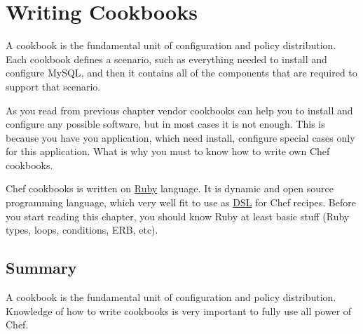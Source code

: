 \chapter{Writing Cookbooks}

A cookbook is the fundamental unit of configuration and policy distribution. Each cookbook defines a scenario, such as everything needed to install and configure MySQL, and then it contains all of the components that are required to support that scenario.

As you read from previous chapter vendor cookbooks can help you to install and configure any possible software, but in most cases it is not enough. This is because you have you application, which need install, configure special cases only for this application. What is why you must to know how to write own Chef cookbooks.

Chef cookbooks is written on \href{https://www.ruby-lang.org}{Ruby} language. It is dynamic and open source programming language, which very well fit to use as \href{http://en.wikipedia.org/wiki/Domain-specific\_language}{DSL} for Chef recipes. Before you start reading this chapter, you should know Ruby at least basic stuff (Ruby types, loops, conditions, ERB, etc).












\section{Summary}

A cookbook is the fundamental unit of configuration and policy distribution. Knowledge of how to write cookbooks is very important to fully use all power of Chef.